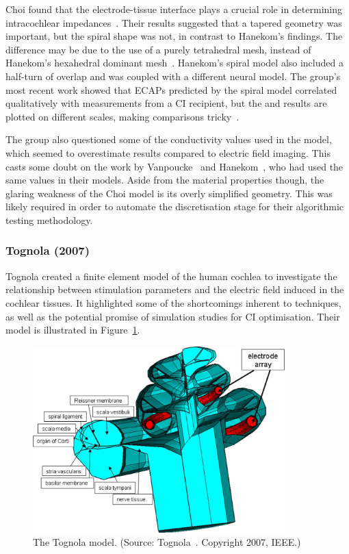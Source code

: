 Choi \etal{} found that the electrode-tissue interface plays a crucial role in
determining intracochlear impedances~\cite{choi2006}. Their results suggested
that a tapered geometry was important, but the spiral shape was not, in contrast
to Hanekom's findings. The difference may be due to the use of a purely
tetrahedral mesh, instead of Hanekom's hexahedral dominant
mesh~\cite{hanekom2001}. Hanekom's spiral model also included a half-turn of
overlap and was coupled with a different neural model. The group's most recent
work showed that ECAPs predicted by the spiral model correlated qualitatively
with measurements from a CI recipient, but the \invivo{} and \insilico{} results
are plotted on different scales, making comparisons tricky~\cite{choi2014}.

The group also questioned some of the conductivity values used in the model,
which seemed to overestimate results compared to electric field imaging. This
casts some doubt on the work by Vanpoucke~\cite{vanpoucke2004identification} and
Hanekom~\cite{hanekom2001,hanekom2005}, who had used the same values in their
models. Aside from the material properties though, the glaring weakness of the
Choi model is its overly simplified geometry. This was likely required in
order to automate the discretisation stage for their algorithmic testing
methodology.

\subsubsection{Tognola \etal{} (2007)}

Tognola \etal{} created a finite element model of the human cochlea to
investigate the relationship between stimulation parameters and the electric
field induced in the cochlear tissues. It highlighted some of the shortcomings
inherent to \invitro{} techniques, as well as the potential promise of
simulation studies for CI optimisation. Their model is illustrated in
Figure~\ref{fig:model_tognola}.

\begin{figure}
	\centering
	\includegraphics[height=7.2cm]{Background/tognola}	
	\caption[The Tognola model]{The Tognola model. (Source:
	Tognola~\cite{tognola2007}. Copyright \textcopyright{} 2007, IEEE.)}
	\label{fig:model_tognola}
\end{figure}

